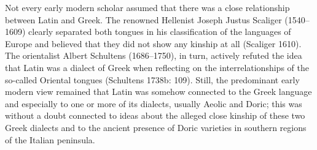 \documentclass[12pt]{article}
\newenvironment{styleStandard}{\renewcommand\baselinestretch{1.25}\setlength\leftskip{0in}\setlength\rightskip{0in}\setlength\parindent{0.1972in}\setlength\parfillskip{0pt plus 1fil}\setlength\parskip{0in plus 1pt}\writerlistparindent\writerlistleftskip\leavevmode\normalfont\normalsize\writerlistlabel\ignorespaces}{\unskip\vspace{0in plus 1pt}\par}
\newcommand\writerlistleftskip{}
\newcommand\writerlistparindent{}
\newcommand\writerlistlabel{}
\begin{document}
\begin{styleStandard}
Not every early modern scholar assumed that there was a close relationship between Latin and Greek. The renowned Hellenist Joseph Justus Scaliger (1540–1609) clearly separated both tongues in his classification of the languages of Europe and believed that they did not show any kinship at all (Scaliger 1610). The orientalist Albert Schultens (1686–1750), in turn, actively refuted the idea that Latin was a dialect of Greek when reflecting on the interrelationships of the so-called Oriental tongues (Schultens 1738b: 109). Still, the predominant early modern view remained that Latin was somehow connected to the Greek language and especially to one or more of its dialects, usually Aeolic and Doric; this was without a doubt connected to ideas about the alleged close kinship of these two Greek dialects and to the ancient presence of Doric varieties in southern regions of the Italian peninsula.
\end{styleStandard}
\end{document}
